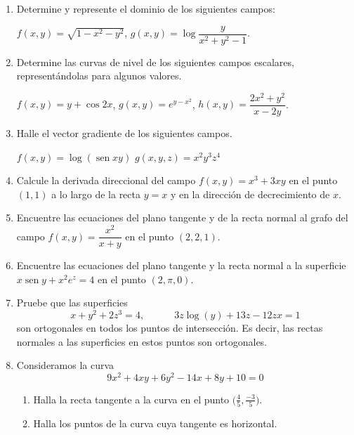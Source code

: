 \begin{enumerate}


\item
Determine y represente el dominio de los siguientes campos:
\setcontadoralph
\begin{centrar}
\nitem $f(x,y)=\sqrt{1-x^2-y^2}$,\hfill
\nitem $g(x,y)=\log\dfrac{y}{x^2+y^2-1}$.
\end{centrar}

\item
Determine las curvas de nivel de los siguientes campos escalares, representándolas para algunos valores.
\setcontadoralph
\begin{centrar}
\nitem
$f(x,y)=y+\cos 2x$, \hfill
\nitem
$g(x,y)=e^{y-x^2}$,\hfill
\nitem
$h(x,y)=\dfrac{2x^2+y^2}{x-2y}$.
\end{centrar}


\item
Halle el vector gradiente de los siguientes campos.
\setcontadoralph
\begin{centrar}
\nitem $f(x,y) = \log (\operatorname{sen} xy)$\hfill
\nitem $g(x,y,z) = x^2y^3z^4$
\end{centrar}

\item
Calcule la derivada direccional del campo $f(x,y)=x^3+3xy$ en el punto $(1,1)$ a lo largo de la recta
$y=x$ y en la dirección de decrecimiento de $x$.

\item
Encuentre las ecuaciones del plano tangente y de la recta normal al grafo del campo $f(x,y)=\dfrac{x^2}{x+y}$
en el punto $(2,2,1)$.

\item
Encuentre las ecuaciones del plano tangente y la recta normal a la superficie  $x\operatorname{sen} y +x^2e^z=4$ en el punto $(2,\pi ,0)$.

\item
Pruebe que las superficies 
\[
x+y^2+2z^3=4,\qquad\quad 3z\log(y)+13z-12zx=1
\]
son ortogonales en todos los puntos de intersección.
Es decir, las rectas normales a las superficies en estos puntos son ortogonales.

\item
Consideramos la curva
\[
9x^2+4xy+6y^2-14x+8y+10=0
\]
\begin{enumerate}
\item
Halla la recta tangente a la curva en el punto $\big(\frac45,\frac{-3}5\big)$.
\item
Halla los puntos de la curva cuya tangente es horizontal.
\end{enumerate}

\end{enumerate}

